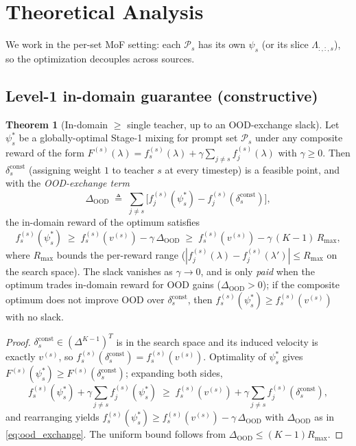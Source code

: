\documentclass[11pt,a4paper]{article}
\newcommand{\OOD}{\mathrm{OOD}}
\newcommand{\const}{\mathrm{const}}
\theoremstyle{definition}
\newtheorem{theorem}{Theorem}
\begin{document}
\section{Theoretical Analysis}
\label{sec:theory}

We work in the per-set MoF setting: each $\mathcal{P}_s$ has its own
$\psi_s$ (or its slice $\Lambda_{:,:,s}$), so the optimization decouples
across sources.

\subsection{Level-1 in-domain guarantee (constructive)}
\label{ssec:level1}

\begin{theorem}[In-domain $\geq$ single teacher, up to an OOD-exchange slack]
\label{thm:level1}
Let $\psi^*_s$ be a globally-optimal Stage-1 mixing for prompt set
$\mathcal{P}_s$ under any composite reward of the form
$F^{(s)}(\lambda) = f_s^{(s)}(\lambda) + \gamma\sum_{j\neq s}f_j^{(s)}(\lambda)$
with $\gamma\geq 0$. Then $\delta_s^{\const}$ (assigning weight $1$ to
teacher $s$ at every timestep) is a feasible point, and with the
\emph{OOD-exchange term}
\begin{equation}
\Delta_{\OOD}
\;\triangleq\;
\sum_{j\neq s}\Big[f_j^{(s)}(\psi^*_s) - f_j^{(s)}(\delta_s^{\const})\Big],
\label{eq:ood_exchange}
\end{equation}
the in-domain reward of the optimum satisfies
\begin{equation}
f_s^{(s)}(\psi^*_s) \;\geq\; f_s^{(s)}(v^{(s)}) - \gamma\,\Delta_{\OOD}
\;\geq\; f_s^{(s)}(v^{(s)}) - \gamma\,(K-1)\,R_{\max},
\end{equation}
where $R_{\max}$ bounds the per-reward range
($|f_j^{(s)}(\lambda)-f_j^{(s)}(\lambda')|\leq R_{\max}$ on the search
space). The slack vanishes as $\gamma\to 0$, and is only \emph{paid} when
the optimum trades in-domain reward for OOD gains
($\Delta_{\OOD}>0$); if the composite optimum does not improve OOD over
$\delta_s^{\const}$, then $f_s^{(s)}(\psi^*_s)\geq f_s^{(s)}(v^{(s)})$
with no slack.
\end{theorem}

\begin{proof}
$\delta_s^{\const}\in (\Delta^{K-1})^T$ is in the search space and its
induced velocity is exactly $v^{(s)}$, so
$f_s^{(s)}(\delta_s^{\const})=f_s^{(s)}(v^{(s)})$. Optimality of
$\psi^*_s$ gives $F^{(s)}(\psi^*_s)\geq F^{(s)}(\delta_s^{\const})$;
expanding both sides,
\[
f_s^{(s)}(\psi^*_s) + \gamma\!\!\sum_{j\neq s}\!f_j^{(s)}(\psi^*_s)
\;\geq\;
f_s^{(s)}(v^{(s)}) + \gamma\!\!\sum_{j\neq s}\!f_j^{(s)}(\delta_s^{\const}),
\]
and rearranging yields
$f_s^{(s)}(\psi^*_s)\geq f_s^{(s)}(v^{(s)})-\gamma\,\Delta_{\OOD}$ with
$\Delta_{\OOD}$ as in \eqref{eq:ood_exchange}. The uniform bound follows
from $\Delta_{\OOD}\leq (K-1)R_{\max}$.
\end{proof}
\end{document}
